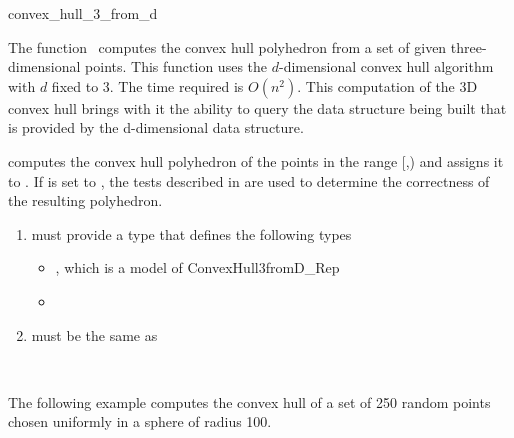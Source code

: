 

\begin{ccRefFunction}{convex_hull_3_from_d}  

\ccDefinition
  
The function \ccRefName\ computes the convex hull polyhedron from a set
of given three-dimensional points.  This function uses the $d$-dimensional
convex hull algorithm with $d$ fixed to 3.  The time required is $O(n^2)$.
This computation of the 3D convex hull brings with it the ability to
query the data structure being built that is provided by the d-dimensional
data structure.


            {computes the convex hull polyhedron 
            of the points in the range [,)
            and assigns it to .  If  is set to
            , the tests described in \cite{mnssssu-cgpvg-96} are
            used to determine the correctness of the resulting polyhedron.
            }

\begin{enumerate}
   \item    {} must provide a type 
            that defines the following types
             \begin{itemize}
               \item {}, which is a model of 
                     ConvexHull3fromD\_Rep
               \item {}
             \end{itemize}
   \item    {} must be the same as
\end{enumerate}

\ccSeeAlso

 \\

\ccExample

The following example computes the convex hull of a set of 250 random 
points chosen uniformly in a sphere of radius 100.


\end{ccRefFunction}



